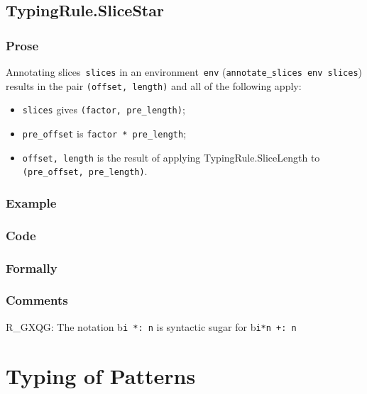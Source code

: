 \documentclass{book}
\begin{document}
\section{TypingRule.SliceStar \label{sec:TypingRule.SliceStar}}

  \subsection{Prose}
      Annotating slices~\texttt{slices} in an environment~\texttt{env}
(\texttt{annotate\_slices env slices}) results in the pair \texttt{(offset,
length)} and all of the following apply:
   \begin{itemize}
   \item \texttt{slices} gives \texttt{(factor, pre\_length)};
   \item \texttt{pre\_offset} is \texttt{factor * pre\_length};
   \item \texttt{offset, length} is the result of applying TypingRule.SliceLength to \texttt{(pre\_offset, pre\_length)}.
   \end{itemize}

  \subsection{Example}

  \subsection{Code}

\begin{emptyformal}
    \subsection{Formally}
\end{emptyformal}

\subsection{Comments}
    R\_GXQG: The notation b\texttt{i *: n} is syntactic sugar for b\texttt{i*n +: n}

\chapter{Typing of Patterns}
\end{document}
